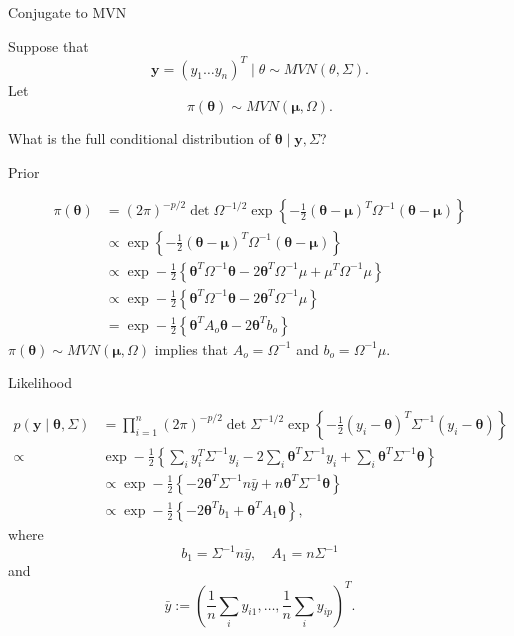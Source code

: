 \documentclass[
  ignorenonframetext,
]{beamer}
\newcommand{\btheta}{{\bm\theta}}
\newcommand{\bmu}{\bm{\mu}}
\begin{document}
\begin{frame}{Conjugate to MVN}
\protect\hypertarget{conjugate-to-mvn}{}

Suppose that
\[\bm{y} = (y_1 \ldots y_n)^T \mid \theta \sim MVN(\theta, \Sigma). \]
Let \[\pi(\btheta) \sim MVN(\bmu, \Omega). \]

What is the full conditional distribution of
\(\btheta \mid \bm{y}, \Sigma\)?

\end{frame}

\begin{frame}{Prior}
\protect\hypertarget{prior}{}

\begin{align}
\pi(\btheta) &= {\left(2\pi\right)}^{-p/2}\det{\Omega}^{-1/2} \exp{\left\{-\frac{1}{2} (\btheta-\bmu)^T\Omega^{-1} (\btheta - \bmu)\right\}} \\
& \propto \exp{\left\{-\frac{1}{2} (\btheta-\bmu)^T\Omega^{-1} (\btheta - \bmu)\right\}} \\
& \propto \exp-\frac{1}{2} {\left \{\btheta^T\Omega^{-1} \btheta - 2 \btheta^T \Omega^{-1} \mu + \mu^T \Omega^{-1} \mu \right \}} \\
& \propto \exp-\frac{1}{2} {\left \{\btheta^T\Omega^{-1} \btheta - 2 \btheta^T \Omega^{-1} \mu  \right \}}\\
&= \exp-\frac{1}{2} {\left \{\btheta^TA_o \btheta - 2 \btheta^T  b_o  \right \}}
\end{align} \(\pi(\btheta) \sim MVN(\bmu, \Omega)\) implies that
\(A_o = \Omega^{-1}\) and \(b_o = \Omega^{-1} \mu.\)

\end{frame}

\begin{frame}{Likelihood}
\protect\hypertarget{likelihood}{}

\begin{align}
p(\bm{y} \mid \btheta, \Sigma) &= \prod_{i=1}^n
{\left(2\pi\right)}^{-p/2}\det{\Sigma}^{-1/2} \exp{\left\{-\frac{1}{2} (y_i-\btheta)^T\Sigma^{-1} (y_i - \btheta)\right\}}\\
\propto 
& \exp-\frac{1}{2} {\left \{ \sum_i y_i^T \Sigma^{-1} y_i -2 \sum_i \btheta^T \Sigma^{-1} y_i + 
\sum_i \btheta^T\Sigma^{-1} \btheta 
 \right \}}\\
 & \propto \exp-\frac{1}{2} {\left \{  -2 \btheta^T \Sigma^{-1} n\bar{y} + 
n \btheta^T\Sigma^{-1} \btheta 
 \right \}}\\
  & \propto \exp-\frac{1}{2} {\left \{  -2 \btheta^T b_1+ 
\btheta^T A_1 \btheta \right \}},
\end{align} where
\[b_1= \Sigma^{-1} n\bar{y}, \quad A_1 = n\Sigma^{-1}\] and
\[\bar{y} := (\frac{1}{n}\sum_i y_{i1} ,\ldots, \frac{1}{n} \sum_i y_{ip})^T.\]

\end{frame}
\end{document}
